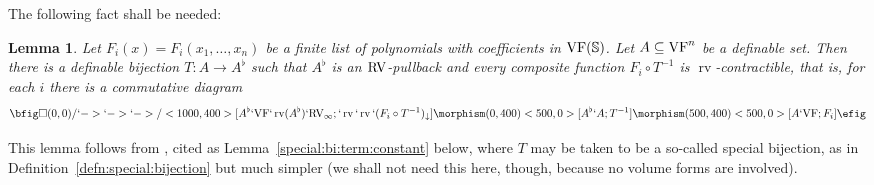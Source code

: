 \documentclass[12pt]{amsart}
\theoremstyle{plain}
\newtheorem{lem}[thm]{Lemma}
\theoremstyle{definition}
\theoremstyle{remark}
\numberwithin{equation}{section}
\theoremstyle{plain}
\newcommand{\VF}{\textup{VF}}
\newcommand{\RV}{\textup{RV}}
\newcommand{\0}{\emptyset}
\newcommand{\bb}[1]{\mathbb{#1}}
\newcommand{\fun}{\longrightarrow}
\newcommand{\sub}{\subseteq}
\DeclareMathOperator{\rv}{rv}
\begin{document}
The following fact shall be needed:

\begin{lem}\label{special:term:constant:disc}
Let $F_i(x) = F_i(x_1, \ldots, x_n)$ be a finite list of polynomials with coefficients in $\VF(\bb S)$. Let $A \sub \VF^n$ be a definable set.  Then there is a definable bijection $T : A \fun A^\flat$ such that $A^\flat$ is an $\RV$-pullback and  every composite function $F_i \circ T^{-1}$ is $\rv$-contractible, that is, for each $i$ there is a commutative diagram
\[
\bfig
  \square(0,0)/`->`->`->/<1000,400>[A^\flat`\VF`\rv(A^\flat)`\RV_\infty;
  `\rv`\rv`(F_i \circ  T^{-1})_{\downarrow}]
  \morphism(0,400)<500,0>[A^\flat`A; T^{-1}]
  \morphism(500,400)<500,0>[A`\VF; F_i]
 \efig
\]
\end{lem}
This lemma follows from \cite[Theorem~5.5]{Yin:special:trans}, cited as Lemma~\ref{special:bi:term:constant} below, where $T$ may be taken to be a so-called special bijection, as in Definition~\ref{defn:special:bijection} but much simpler (we shall not need this here, though, because no volume forms are involved).
\end{document}
